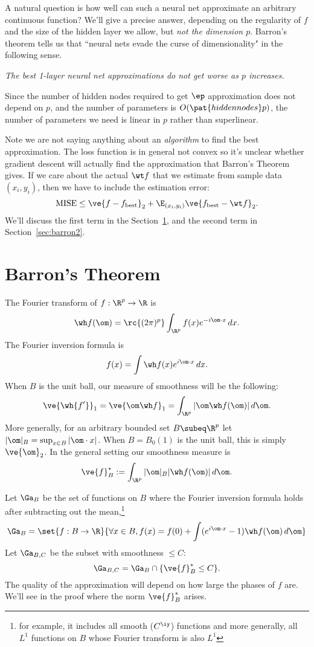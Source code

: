 A natural question is how well can such a neural net approximate an arbitrary continuous function? We'll give a precise answer, depending on the regularity of $f$ and the size of the hidden layer we allow, but {\it not the dimension $p$}.
Barron's theorem tells us that ``neural nets evade the curse of dimensionality" in the following sense.

{\it The best 1-layer neural net approximations do not get worse as $p$ increases.}

Since the number of hidden nodes required to get $\ep$ approximation does not depend on $p$, and the number of parameters is $O(\pat{hidden nodes}p)$, the number of parameters we need is linear in $p$ rather than superlinear.

Note we are not saying anything about an {\it algorithm} to find the best approximation. The loss function is in general not convex so it's unclear whether gradient descent will actually find the approximation that Barron's Theorem gives. If we care about the actual $\wt f$ that we estimate from sample data $(x_i,y_i)$, then we have to include the estimation error:
\[
\text{MISE} \le \ve{f-f_{\text{best}}}_2+\E_{(x_i,y_i)} \ve{f_{\text{best}}-\wt f}_2.
\]
We'll discuss the first term in the Section~\ref{sec:barron}, and the second term in Section~\ref{sec:barron2}.



\section{Barron's Theorem}
\label{sec:barron}
The Fourier transform of $f:\R^p\to \R$ is
\[
\wh f(\om)=\rc{(2\pi)^p}\int_{\R^p} f(x)e^{-i\om\cdot x}\,dx.
\]
The Fourier inversion formula is
\[
f(x) = \int \wh f(x)e^{i\om\cdot x}\,dx.
\]
When $B$ is the unit ball, our measure of smoothness will be the following:
\[
\ve{\wh{f'}}_1 = \ve{\om \wh f}_1 = \int_{\R^p} |\om \wh f(\om)|\,d\om.
\]
More generally, for an arbitrary bounded set $B\subeq \R^p$ %
let $|\om|_B=\sup_{x\in B} |\om \cdot x|$. When $B=B_0(1)$ is the unit ball, this is simply $\ve{\om}_2$. %
In the general setting our smoothness measure is 
\[
\ve{f}_B^* :=\int_{\R^p} |\om|_B |\wh f(\om)|\,d\om.
\]

Let $\Ga_B$ be the set of functions on $B$ where the Fourier inversion formula holds after subtracting out the mean,\footnote{for example, it includes all smooth ($C^{\iy}$) functions and more generally, all $L^1$ functions on $B$ whose Fourier transform is also $L^1$}
\[
\Ga_B=\set{f:B\to \R}{\forall x\in B, f(x)=f(0) + \int (e^{i\om \cdot x}-1)\wh f(\om)\,d\om}
\]
Let $\Ga_{B,C}$ be the subset with smoothness $\le C$:
\[
\Ga_{B,C}=\Ga_B \cap \{\ve{f}_B^*\le C\}.
\]
The quality of the approximation will depend on how large the phases of $f$ are. We'll see in the proof where the norm $\ve{f}_B^*$ arises.

